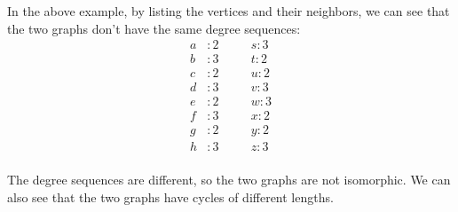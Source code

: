 \documentclass[11pt]{article}
\begin{document}
In the above example, by listing the vertices and their neighbors, we can see that the two graphs don't have the same degree sequences:
\begin{align*}
    a & : 2 & \quad & s : 3 \\
    b & : 3 & \quad & t : 2 \\
    c & : 2 & \quad & u : 2 \\
    d & : 3 & \quad & v : 3 \\
    e & : 2 & \quad & w : 3 \\
    f & : 3 & \quad & x : 2 \\
    g & : 2 & \quad & y : 2 \\
    h & : 3 & \quad & z : 3 \\
\end{align*}

The degree sequences are different, so the two graphs are not isomorphic. We can also see that the two graphs have cycles of different lengths. 
\end{document}
